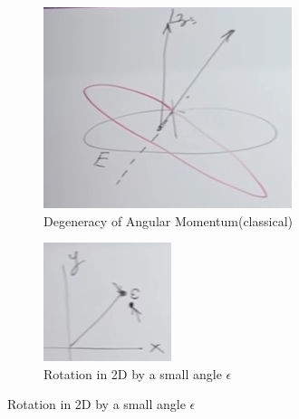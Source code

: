 \documentclass[]{article}
\begin{document}
\begin{figure}[H]
	\caption{An example: Angular Momentum}
	\begin{subfigure}[t]{0.45\textwidth}
		\caption{Degeneracy of Angular Momentum(classical)}\label{eq:aqm-2-1}
		\includegraphics[width=\textwidth]{aqm-2-1}
	\end{subfigure}
	\begin{subfigure}[t]{0.45\textwidth}
		\caption{Rotation in 2D by a small angle $\epsilon$}\label{fig:aqm-2-2}
		\includegraphics[width=\textwidth]{aqm-2-2}
	\end{subfigure}
\end{figure}
\end{document}
